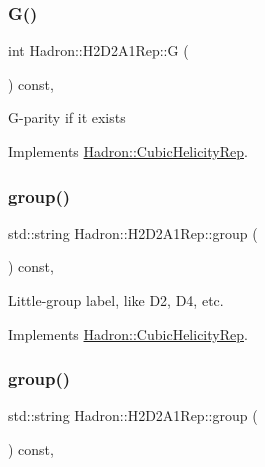 \subsubsection{\texorpdfstring{G()}{G()}\hspace{0.1cm}{\footnotesize\ttfamily [3/3]}}
{\footnotesize\ttfamily int Hadron\+::\+H2\+D2\+A1\+Rep\+::G (\begin{DoxyParamCaption}{ }\end{DoxyParamCaption}) const\hspace{0.3cm}{\ttfamily [inline]}, {\ttfamily [virtual]}}

G-\/parity if it exists 

Implements \mbox{\hyperlink{structHadron_1_1CubicHelicityRep_a50689f42be1e6170aa8cf6ad0597018b}{Hadron\+::\+Cubic\+Helicity\+Rep}}.

\mbox{\label{structHadron_1_1H2D2A1Rep_a8e1e801312be98b0f43fff8d5d61f0a4}} 
\subsubsection{\texorpdfstring{group()}{group()}\hspace{0.1cm}{\footnotesize\ttfamily [1/5]}}
{\footnotesize\ttfamily std\+::string Hadron\+::\+H2\+D2\+A1\+Rep\+::group (\begin{DoxyParamCaption}{ }\end{DoxyParamCaption}) const\hspace{0.3cm}{\ttfamily [inline]}, {\ttfamily [virtual]}}

Little-\/group label, like D2, D4, etc. 

Implements \mbox{\hyperlink{structHadron_1_1CubicHelicityRep_a101a7d76cd8ccdad0f272db44b766113}{Hadron\+::\+Cubic\+Helicity\+Rep}}.

\mbox{\label{structHadron_1_1H2D2A1Rep_a8e1e801312be98b0f43fff8d5d61f0a4}} 
\subsubsection{\texorpdfstring{group()}{group()}\hspace{0.1cm}{\footnotesize\ttfamily [2/5]}}
{\footnotesize\ttfamily std\+::string Hadron\+::\+H2\+D2\+A1\+Rep\+::group (\begin{DoxyParamCaption}{ }\end{DoxyParamCaption}) const\hspace{0.3cm}{\ttfamily [inline]}, {\ttfamily [virtual]}}

